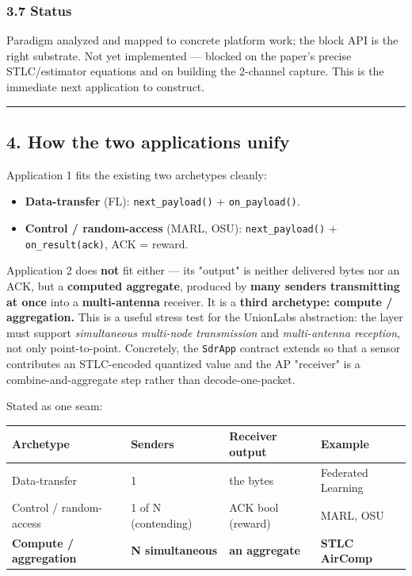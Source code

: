 \documentclass[
  10pt,
]{article}
\providecommand{\tightlist}{%
  \setlength{\itemsep}{0pt}\setlength{\parskip}{0pt}}
\begin{document}
\hypertarget{37-status}{%
\subsubsection{3.7 Status}\label{37-status}}

Paradigm analyzed and mapped to concrete platform work; the block API is
the right substrate. Not yet implemented --- blocked on the paper's
precise STLC/estimator equations and on building the 2-channel capture.
This is the immediate next application to construct.

\begin{center}\rule{0.5\linewidth}{0.5pt}\end{center}

\hypertarget{4-how-the-two-applications-unify}{%
\subsection{4. How the two applications
unify}\label{4-how-the-two-applications-unify}}

Application 1 fits the existing two archetypes cleanly:

\begin{itemize}
\tightlist
\item
  \textbf{Data-transfer} (FL): \texttt{next\_payload()} +
  \texttt{on\_payload()}.
\item
  \textbf{Control / random-access} (MARL, OSU): \texttt{next\_payload()}
  + \texttt{on\_result(ack)}, ACK = reward.
\end{itemize}

Application 2 does \textbf{not} fit either --- its "output" is neither
delivered bytes nor an ACK, but a \textbf{computed aggregate}, produced
by \textbf{many senders transmitting at once} into a
\textbf{multi-antenna} receiver. It is a \textbf{third archetype:
compute / aggregation.} This is a useful stress test for the UnionLabs
abstraction: the layer must support \emph{simultaneous multi-node
transmission} and \emph{multi-antenna reception}, not only
point-to-point. Concretely, the \texttt{SdrApp} contract extends so that
a sensor contributes an STLC-encoded quantized value and the AP
"receiver" is a combine-and-aggregate step rather than
decode-one-packet.

Stated as one seam:

\begin{longtable}[]{@{}llll@{}}
\toprule
Archetype & Senders & Receiver output & Example \\
\midrule
\endhead
Data-transfer & 1 & the bytes & Federated Learning \\
Control / random-access & 1 of N (contending) & ACK bool (reward) &
MARL, OSU \\
\textbf{Compute / aggregation} & \textbf{N simultaneous} & \textbf{an
aggregate} & \textbf{STLC AirComp} \\
\bottomrule
\end{longtable}
\end{document}
